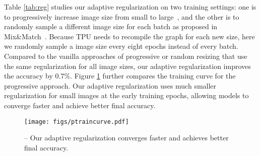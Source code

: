 \documentclass{article}
\begin{document}
Table \ref{tab:reg} studies our adaptive regularization on two training settings: one is to progressively increase image size from small to large~\cite{fastaidawnbench}, and the other is to randomly sample a different image size for each batch as proposed in Mix\&Match~\cite{mixmatch19}. Because TPU needs to recompile the graph for each new size, here we randomly sample a image size every eight epochs instead of every batch. Compared to the vanilla approaches of progressive or random resizing that use the same regularization for all image sizes, our adaptive regularization improves the accuracy by 0.7\%. Figure \ref{fig:ptraincurve} further compares the training curve for the progressive approach. Our adaptive regularization uses much smaller regularization for small images at the early training epochs, allowing models to converge faster and achieve better final accuracy.

\begin{table}[!h]
    \vskip -0.1in
    \caption{
         Adaptive regularization -- We compare ImageNet top-1 accuracy based on the average of three runs.
       }
    \centering
    \label{tab:reg}
    \vskip -0.1in
\end{table} 
\begin{figure}[h]
    \vskip -0.1in
    \centering
    \texttt{[image: figs/ptraincurve.pdf]}
    \vskip -0.2in
    \caption{
         -- Our adaptive regularization converges faster and achieves better final accuracy.
    }
    \label{fig:ptraincurve}
    \vskip -0.1in
\end{figure}
 
\end{document}

